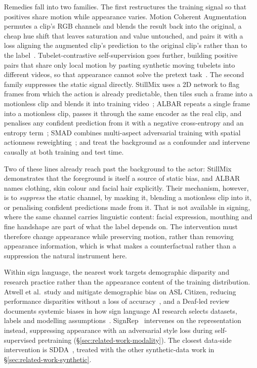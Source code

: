 Remedies fall into two families. The first restructures the training
signal so that positives share motion while appearance varies. Motion
Coherent Augmentation permutes a clip's RGB channels and blends the
result back into the original, a cheap hue shift that leaves saturation
and value untouched, and pairs it with a loss aligning the augmented
clip's prediction to the original clip's rather than to the
label~\cite{zhangDontJudgeLook2024}. Tubelet-contrastive self-supervision
goes further, building positive pairs that share only local motion by
pasting synthetic moving tubelets into different videos, so that
appearance cannot solve the pretext
task~\cite{thokerTubeletContrastiveSelfSupervisionVideoEfficient2023b}.
The second family suppresses the static signal directly. StillMix uses a
2D network to flag frames from which the action is already predictable,
then tiles such a frame into a motionless clip and blends it into
training video~\cite{liMitigatingEvaluatingStatic2023a}; ALBAR repeats a
single frame into a motionless clip, passes it through the same encoder
as the real clip, and penalises any confident prediction from it with a
negative cross-entropy and an entropy
term~\cite{fioresiALBARAdversarialLearning2025}; SMAD combines
multi-aspect adversarial training with spatial actionness
reweighting~\cite{duanMitigatingRepresentationBias2023}; and
\citet{rastegarBackgroundNoMore2024} treat the background as a confounder
and intervene causally at both training and test time.

Two of these lines already reach past the background to the actor:
StillMix demonstrates that the foreground is itself a source of static
bias, and ALBAR names clothing, skin colour and facial hair explicitly.
Their mechanism, however, is to \emph{suppress} the static channel, by
masking it, blending a motionless clip into it, or penalising confident
predictions made from it. That is not available in signing, where the
same channel carries linguistic content: facial expression, mouthing and
fine handshape are part of what the label depends on. The intervention
must therefore change appearance while preserving motion, rather than
removing appearance information, which is what makes a counterfactual
rather than a suppression the natural instrument here.

Within sign language, the nearest work targets demographic disparity and
research practice rather than the appearance content of the training
distribution. Atwell et al.\ study and mitigate demographic bias on ASL
Citizen, reducing performance disparities without a loss of
accuracy~\cite{atwellStudyingMitigatingBiases2024}, and a Deaf-led review
documents systemic biases in how sign language AI research selects
datasets, labels and modelling
assumptions~\cite{desaiSystemicBiasesSign2024}.
SignRep~\cite{wongSignRepEnhancingSelfSupervised2025} intervenes on the
representation instead, suppressing appearance with an adversarial style
loss during self-supervised pretraining
(\S\ref{sec:related-work-modality}). The closest data-side intervention
is SDDA~\cite{fuSignerDiversitydrivenData2024b}, treated with the other
synthetic-data work in \S\ref{sec:related-work-synthetic}.

